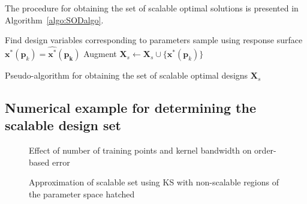 The procedure for obtaining the set of scalable optimal solutions is presented in Algorithm~\ref{algo:SODalgo}.

\begin{algorithm}
	\DontPrintSemicolon %
	 {

		 {
			Find design variables corresponding to parameters sample using response surface $\mathbf{x}^*(\mathbf{p}_k) = \hat{\mathbf{x}^*}(\mathbf{p_k})$\;
			Augment $\mathbf{X}_s \gets \mathbf{X}_s \cup \{ \mathbf{x}^*(\mathbf{p}_k) \} $\;
		}
	}
	\caption{Pseudo-algorithm for obtaining the set of scalable optimal designs $\mathbf{X}_s$}
	\label{algo:SODalgo}
\end{algorithm}

\subsection{Numerical example for determining the scalable design set} \label{subsec:numex}

\begin{figure*}[h!]
	\centering
	 \hspace{0.07\textwidth}%
	\caption{Effect of number of training points and kernel bandwidth on order-based error}
	\label{fig:HPeffect}
\end{figure*}

\begin{figure*}[h!]
	\centering
	 \hspace{0.07\textwidth}%
	\caption{Approximation of scalable set using \ac{KS} with non-scalable regions of the parameter space hatched}
	\label{fig:testfun}
\end{figure*}

